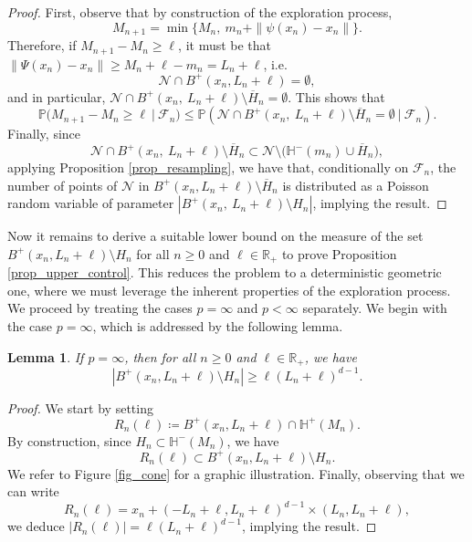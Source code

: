\documentclass[a4paper, 11pt]{article}
\theoremstyle{plain}
\newtheorem{Lemma}[Theorem]{Lemma}
\theoremstyle{definition}
\newcommand{\R}{\mathbb{R}}
\renewcommand{\P}{\mathbb{P}}
\numberwithin{equation}{section}
\begin{document}
\begin{proof}
    First, observe that by construction of the exploration process, 
        \[M_{n+1}=\min\{M_n,~m_n+\|\psi(x_n)-x_n\|\}.\]
    Therefore, if $M_{n+1}-M_n\geq \ell$, it must be that $\|\Psi(x_n)-x_n\|\geq M_n+\ell-m_n=L_n+\ell$, i.e.\
        \[\mathcal N\cap B^+(x_n,L_n+\ell)=\emptyset,\]
    and in particular, $\mathcal N\cap B^+(x_n,~L_n+\ell)\setminus\overline{H}_n=\emptyset$. This shows that
        \[\P\big(M_{n+1}-M_n\geq \ell~\vert~\mathcal F_n\big)\leq\P(\mathcal N\cap B^+(x_n,~L_n+\ell)\setminus \overline{H}_n=\emptyset~|~\mathcal F_n).\]
    Finally, since 
        \[\mathcal N\cap B^+(x_n,~L_n+\ell)\setminus\overline{H}_n\subset\mathcal N\setminus\big(\mathbb H^-(m_n)\cup\overline{H}_n\big),\]
    applying Proposition \ref{prop_resampling}, we have that, conditionally on $\mathcal F_n$, the number of points of $\mathcal N$ in $B^+(x_n,L_n+\ell)\setminus \overline{H}_n$ is distributed as a Poisson random variable of parameter $|B^+(x_n,~L_n+\ell)\setminus H_n|$, implying the result.
\end{proof}


Now it remains to derive a suitable lower bound on the measure of the set $B^+(x_n, L_n+\ell)\setminus H_n$ for all $n\geq0$ and $\ell\in\R_+$ to prove Proposition \ref{prop_upper_control}. This reduces the problem to a deterministic geometric one, where we must leverage the inherent properties of the exploration process. We proceed by treating the cases $p=\infty$ and $p<\infty$ separately. We begin with the case $p=\infty$, which is addressed by the following lemma.


\begin{Lemma}
    \label{lemma_area_linfty}
    If $p=\infty$, then for all $n\geq 0$ and $\ell\in\R_+$, we have 
        \[|B^+(x_n,L_n+\ell)\setminus H_n|\geq \ell(L_n+\ell)^{d-1}.\]
\end{Lemma}

\begin{proof}
    We start by setting
        \[R_n(\ell)\coloneqq B^+(x_n, L_n+\ell)\cap\mathbb H^+(M_n).\]
    By construction, since $H_n\subset\mathbb H^-(M_n)$, we have
        \[R_n(\ell)\subset B^+(x_n,L_n+\ell)\setminus H_n.\]
    We refer to Figure \ref{fig_cone} for a graphic illustration. Finally, observing that we can write
        \[R_n(\ell)=x_n+(-L_n+\ell, L_n+\ell)^{d-1}\times(L_n, L_n+\ell),\]
    we deduce $|R_n(\ell)|=\ell(L_n+\ell)^{d-1}$, implying the result.
\end{proof}
\end{document}
